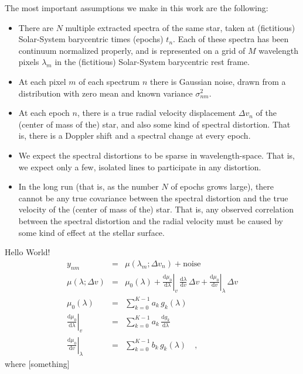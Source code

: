 \documentclass[12pt, letterpaper]{article}
\newcommand{\dd}{\mathrm{d}}
\begin{document}
The most important assumptions we make in this work are the following:
\begin{itemize}\itemsep=0ex
\item There are $N$ multiple extracted spectra of the same star, taken
  at (fictitious) Solar-System barycentric times (epochs) $t_n$. Each
  of these spectra has been continuum normalized properly, and is
  represented on a grid of $M$ wavelength pixels $\lambda_m$ in the
  (fictitious) Solar-System barycentric rest frame.
\item At each pixel $m$ of each spectrum $n$ there is Gaussian noise,
  drawn from a distribution with zero mean and known variance
  $\sigma^2_{nm}$.
\item At each epoch $n$, there is a true radial velocity displacement
  $\Delta v_n$ of the (center of mass of the) star, and also some kind
  of spectral distortion.  That is, there is a Doppler shift and a
  spectral change at every epoch.
\item We expect the spectral distortions to be sparse in
  wavelength-space.  That is, we expect only a few, isolated lines to
  participate in any distortion.
\item In the long run (that is, as the number $N$ of epochs grows
  large), there cannot be any true covariance between the spectral
  distortion and the true velocity of the (center of mass of the)
  star. That is, any observed correlation between the spectral
  distortion and the radial velocity must be caused by some kind of
  effect at the stellar surface.
\end{itemize}

Hello World!
\begin{eqnarray}
  y_{nm} &=& \mu(\lambda_m; \Delta v_n) + \mathrm{noise}
  \\
  \mu(\lambda; \Delta v) &=& \mu_0(\lambda)
  + \left.\frac{\dd \mu_0}{\dd\lambda}\right|_{v}\,\frac{\dd\lambda}{\dd v}\,\Delta v
  + \left.\frac{\dd \mu_0}{\dd v}\right|_{\lambda}\,\Delta v
  \\
  \mu_0(\lambda) &=& \sum_{k=0}^{K-1} a_k\,g_k(\lambda)
  \\
  \left.\frac{\dd \mu_0}{\dd\lambda}\right|_{v} &=& \sum_{k=0}^{K-1} a_k\,\frac{\dd g_k}{\dd\lambda}
  \\
  \left.\frac{\dd \mu_0}{\dd v}\right|_{\lambda} &=& \sum_{k=0}^{K-1} b_k\,g_k(\lambda)
  \quad ,
\end{eqnarray}
where [something]
\end{document}
